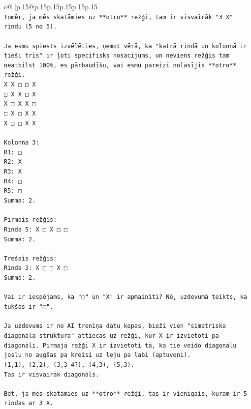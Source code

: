 \documentclass{article}
\begin{document}
{\begin{supertabular}{c@{$\;$}|p{.15\linewidth}@{}p{.15\linewidth}p{.15\linewidth}p{.15\linewidth}p{.15\linewidth}p{.15\linewidth}}
{{{\\ 
\texttt{Tomēr, ja mēs skatāmies uz **otro** režģi, tam ir visvairāk "3 X" rindu (5 no 5).} \\
\\ 
\texttt{Ja esmu spiests izvēlēties, ņemot vērā, ka "katrā rindā un kolonnā ir tieši trīs" ir ļoti specifisks nosacījums, un neviens režģis tam neatbilst 100\%, es pārbaudīšu, vai esmu pareizi nolasījis **otro** režģi.} \\
\texttt{X X □ □ X} \\
\texttt{□ X X □ X} \\
\texttt{X □ X X □} \\
\texttt{□ X □ X X} \\
\texttt{X □ □ X X} \\
\\ 
\texttt{Kolonna 3:} \\
\texttt{R1: □} \\
\texttt{R2: X} \\
\texttt{R3: X} \\
\texttt{R4: □} \\
\texttt{R5: □} \\
\texttt{Summa: 2.} \\
\\ 
\texttt{Pirmais režģis:} \\
\texttt{Rinda 5: X □ X □ □} \\
\texttt{Summa: 2.} \\
\\ 
\texttt{Trešais režģis:} \\
\texttt{Rinda 3: X □ □ X □} \\
\texttt{Summa: 2.} \\
\\ 
\texttt{Vai ir iespējams, ka "▢" un "X" ir apmainīti? Nē, uzdevumā teikts, ka tukšās ir "▢".} \\
\\ 
\texttt{Ja uzdevums ir no AI treniņa datu kopas, bieži vien "simetriska diagonāla struktūra" attiecas uz režģi, kur X ir izvietoti pa diagonāli. Pirmajā režģī X ir izvietoti tā, ka tie veido diagonālu joslu no augšas pa kreisi uz leju pa labi (aptuveni).} \\
\texttt{(1,1), (2,2), (3,3{-}4?), (4,3), (5,3).} \\
\texttt{Tas ir visvairāk diagonāls.} \\
\\ 
\texttt{Bet, ja mēs skatāmies uz **otro** režģi, tas ir vienīgais, kuram ir 5 rindas ar 3 X.} \\
}}}
\end{supertabular}}
\end{document}
